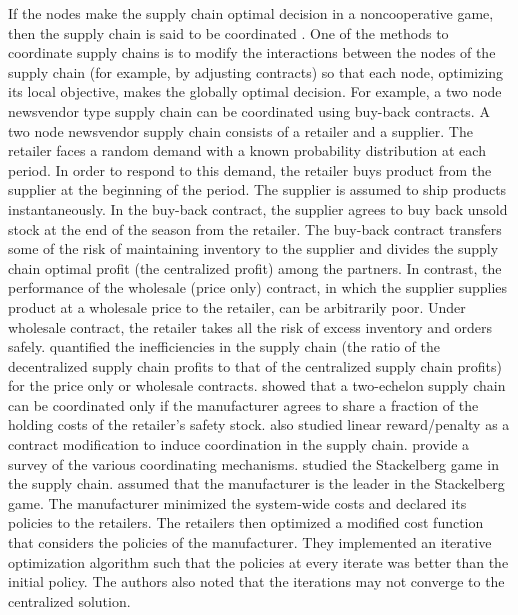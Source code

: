 If the nodes make the supply chain optimal decision in a
noncooperative game, then the supply chain is said to be coordinated
\citep{cachon:zipkin:1999}. 
One of the methods to coordinate supply chains is to modify the 
interactions between the nodes of the supply chain (for example, by
adjusting contracts) so that each  node, optimizing its
local objective, makes the globally optimal decision. For example, a
two node newsvendor type supply chain can be coordinated using
buy-back contracts. A two node newsvendor supply chain consists of a
retailer and a supplier. The retailer faces a random demand with a
known probability distribution at each period. In order to respond to
this demand, the retailer buys product from the supplier at the
beginning of the period. The supplier is assumed to ship products
instantaneously. In the buy-back contract, the supplier agrees
to buy back unsold stock at the end of the season from the
retailer. The buy-back contract 
transfers  some of the risk of maintaining inventory to the supplier and
divides the supply chain optimal profit (the centralized profit) among
the partners. In contrast, the performance of  the wholesale (price
only) contract, in which the 
supplier supplies product at a wholesale price to the retailer,
can be arbitrarily poor. Under wholesale contract, the retailer takes all the risk
of excess inventory and orders
safely\citep{cachon:2003,cachon:zipkin:1999}. \citet{perakis:roels:2007}
quantified the inefficiencies in the supply chain (the ratio of the
decentralized supply chain profits to that of the centralized supply
chain profits) for the price only or wholesale
contracts. \citet{moses:seshadri:2000} showed that a  two-echelon supply
chain can be coordinated only if the manufacturer agrees to share a
fraction of the holding costs of the retailer's safety
stock. \citet{golany:rothblum:2006} also studied linear
reward/penalty as a contract modification to induce coordination in
the supply chain. \citet{li:wang:2007} provide a survey of the
various coordinating mechanisms. \citet{axsater:2001} studied the
Stackelberg game in the supply chain. \citet{axsater:2001} assumed that the
manufacturer is the leader in the Stackelberg game. The manufacturer
minimized the system-wide costs and declared its policies to the
retailers. The retailers  then optimized a modified cost function that
considers the policies of the manufacturer. They implemented an
iterative optimization algorithm such that the policies at every
iterate was better than the initial policy. The authors also noted
that the iterations 
may not converge to the centralized solution.
 

